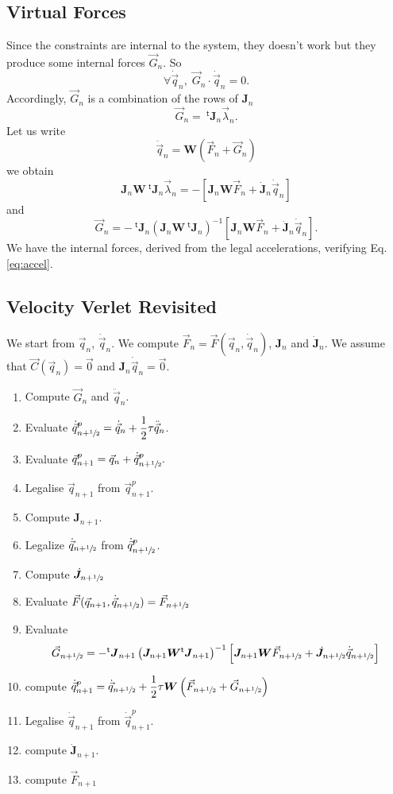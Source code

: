 \documentclass[aps,twocolumn]{revtex4}
\newcommand{\mymat}[1]{\boldsymbol{#1}}
\newcommand{\mytrn}[1]{{\!\!~^{\mathsf{t}}{#1}}}
\newcommand{\half}{\sfrac{1}{2}}
\newcommand{\q}{\vec{q}}
\newcommand{\dq}{\dot{\q}}
\newcommand{\ddq}{\ddot{\q}}
\newcommand{\C}{\vec{C}}
\newcommand{\J}{\mymat{J}}
\newcommand{\dJ}{\dot{\J}}
\newcommand{\tJ}{\mytrn{\J}}
\newcommand{\G}{\vec{G}}
\newcommand{\W}{\mymat{W}}
\begin{document}
\subsection{Virtual Forces}
Since the constraints are internal to the system, they doesn't work but they produce some internal
forces $\G_n$. So
\begin{equation}
\forall \dq_n, \; \G_n\cdot\dq_n = 0.
\end{equation}
Accordingly, $\G_n$ is a combination of the rows of $\J_n$
\begin{equation}
	\G_n = \tJ_n \vec{\lambda}_n.
\end{equation}
Let us write
\begin{equation}
	\ddq_n = \W \left( \vec{F}_n + \G_n \right)
\end{equation}
we obtain
\begin{equation}
	\J_n \W \tJ_n \vec{\lambda}_n = -\left\lbrack \J_n\W\vec{F}_n + \dJ_n \dq_n \right\rbrack
\end{equation}
and
\begin{equation}
	\G_n = - \tJ_n \left(\J_n \W \tJ_n \right)^{-1}\left\lbrack \J_n\W\vec{F}_n + \dJ_n \dq_n \right\rbrack.
\end{equation}
We have the internal forces, derived from the legal accelerations, verifying Eq. \ref{eq:accel}.

\subsection{Velocity Verlet Revisited}

We start from $\q_n$, $\dq_n$. We compute $\vec{F}_n=\vec{F}(\q_n,\dq_n)$, 
$\J_n$ and $\dJ_n$.
We assume that $\C(\q_n)=\vec{0}$ and $\J_n\dq_n=\vec{0}$.
\begin{enumerate}
\item Compute $\G_n$ and $\ddq_n$.
\item Evaluate $\dq_{n+\half}^p = \dq_n + \dfrac{1}{2}\tau \ddq_n$.
\item Evaluate $\q_{n+1}^p=\q_n + \dq_{n+\half}^p.$
\item Legalise $\q_{n+1}$ from $\q_{n+1}^p$.
\item Compute  $\J_{n+1}$.
\item Legalize $\dq_{n+\half}$ from $\dq_{n+\half}^p$.
\item Compute  $\dJ_{n+\half}$
\item Evaluate $\vec{F}(\q_{n+1},\dq_{n+\half}) = \vec{F}_{n+\half}$
\item Evaluate 
	$$\G_{n+\half}=
	-\tJ_{n+1} \left(\J_{n+1} \W \tJ_{n+1} \right)^{-1}\left\lbrack \J_{n+1}\W\vec{F}_{n+\half} + \dJ_{n+\half} \dq_{n+\half} \right\rbrack$$
\item compute $\dq_{n+1}^p = \dq_{n+\half} + 
\dfrac{1}{2}\tau \W \left(\vec{F}_{n+\half}+\G_{n+\half}\right)$
\item Legalise $\dq_{n+1}$ from $\dq_{n+1}^p$.
\item compute $\dJ_{n+1}$.
\item compute $\vec{F}_{n+1}$
\end{enumerate}
\end{document}
